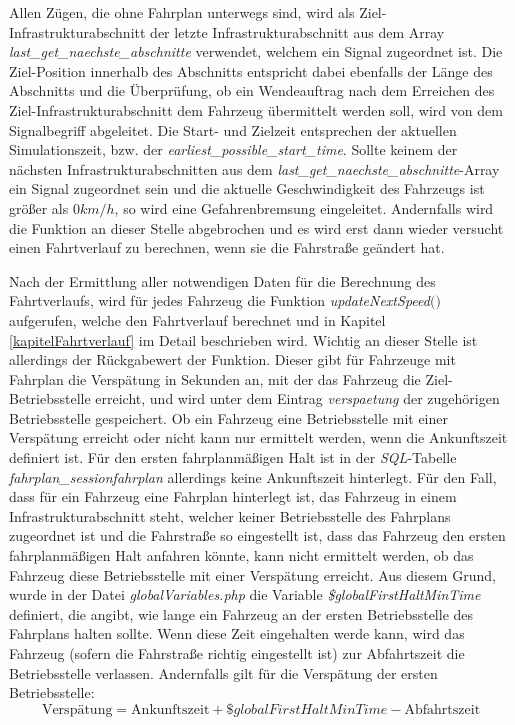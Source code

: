 Allen Zügen, die ohne Fahrplan unterwegs sind, wird als Ziel-Infrastrukturabschnitt der letzte Infrastrukturabschnitt aus dem Array \textit{last\_get\_naechste\_abschnitte} verwendet, welchem ein Signal zugeordnet ist. Die Ziel-Position innerhalb des Abschnitts entspricht dabei ebenfalls der Länge des Abschnitts und die Überprüfung, ob ein Wendeauftrag nach dem Erreichen des Ziel-Infrastrukturabschnitt dem Fahrzeug übermittelt werden soll, wird von dem Signalbegriff abgeleitet. Die Start- und Zielzeit entsprechen der aktuellen Simulationszeit, bzw. der \textit{earliest\_possible\_start\_time}. Sollte keinem der nächsten Infrastrukturabschnitten aus dem \textit{last\_get\_naechste\_abschnitte}-Array ein Signal zugeordnet sein und die aktuelle Geschwindigkeit des Fahrzeugs ist größer als $0km/h$, so wird eine Gefahrenbremsung eingeleitet. Andernfalls wird die Funktion an dieser Stelle abgebrochen und es wird erst dann wieder versucht einen Fahrtverlauf zu berechnen, wenn sie die Fahrstraße geändert hat.

Nach der Ermittlung aller notwendigen Daten für die Berechnung des Fahrtverlaufs, wird für jedes Fahrzeug die Funktion \textit{updateNextSpeed$($$)$} aufgerufen, welche den Fahrtverlauf berechnet und in Kapitel \ref{kapitelFahrtverlauf} im Detail beschrieben wird. Wichtig an dieser Stelle ist allerdings der Rückgabewert der Funktion. Dieser gibt für Fahrzeuge mit Fahrplan die Verspätung in Sekunden an, mit der das Fahrzeug die Ziel-Betriebsstelle erreicht, und wird unter dem Eintrag \textit{verspaetung} der zugehörigen Betriebsstelle gespeichert. Ob ein Fahrzeug eine Betriebsstelle mit einer Verspätung erreicht oder nicht kann nur ermittelt werden, wenn die Ankunftszeit definiert ist. Für den ersten fahrplanmäßigen Halt ist in der \textit{SQL}-Tabelle \textit{fahrplan\_sessionfahrplan} allerdings keine Ankunftszeit hinterlegt. Für den Fall, dass für ein Fahrzeug eine Fahrplan hinterlegt ist, das Fahrzeug in einem Infrastrukturabschnitt steht, welcher keiner Betriebsstelle des Fahrplans zugeordnet ist und die Fahrstraße so eingestellt ist, dass das Fahrzeug den ersten fahrplanmäßigen Halt anfahren könnte, kann nicht ermittelt werden, ob das Fahrzeug diese Betriebsstelle mit einer Verspätung erreicht. Aus diesem Grund, wurde in der Datei \textit{globalVariables.php} die Variable \textit{\$globalFirstHaltMinTime} definiert, die angibt, wie lange ein Fahrzeug an der ersten Betriebsstelle des Fahrplans halten sollte. Wenn diese Zeit eingehalten werde kann, wird das Fahrzeug (sofern die Fahrstraße richtig eingestellt ist) zur Abfahrtszeit die Betriebsstelle verlassen. Andernfalls gilt für die Verspätung der ersten Betriebsstelle:
\begin{equation*}
\textrm{Verspätung} = \textrm{Ankunftszeit} + \textit{\$globalFirstHaltMinTime} - \textrm{Abfahrtszeit}
\end{equation*}
